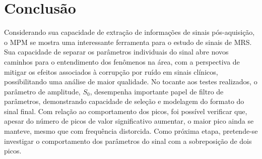 \documentclass[12pt]{article}
\begin{document}
\section{Conclusão}
Considerando sua capacidade de extração de informações de sinais pós-aquisição, o MPM se mostra uma interessante ferramenta 
para o estudo de sinais de MRS. Sua capacidade de separar os parâmetros individuais do sinal abre novos caminhos para o entendimento 
dos fenômenos na área, com a perspectiva de mitigar os efeitos associados à corrupção por ruído em sinais clínicos, possibilitando uma 
análise de maior qualidade. No tocante aos testes realizados, o parâmetro de amplitude, $S_0$, desempenha importante papel de filtro de 
parâmetros, demonstrando capacidade de seleção e modelagem do formato do sinal final. Com relação ao comportamento dos picos, foi 
possível verificar que, apesar do número de picos de valor significativo aumentar, o maior pico ainda se manteve, mesmo que com 
frequência distorcida. Como próxima etapa, pretende-se investigar o comportamento dos parâmetros do sinal com a sobreposição de 
dois picos.




\end{document}
